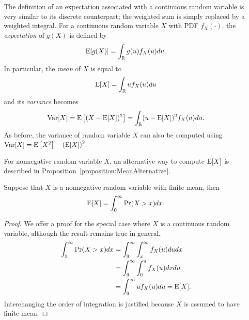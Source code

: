 The definition of an expectation associated with a continuous random variable is very similar to its discrete counterpart;
the weighted sum is simply replaced by a weighted integral.
For a continuous random variable $X$ with PDF $f_X(\cdot)$, the \emph{expectation} of $g(X)$ is defined by 
\begin{equation*}
\mathrm{E} [g(X)]
= \int_{\mathbb{R}} g(u) f_X (u) du .
\end{equation*}
In particular, the \emph{mean} of $X$ is equal to 
\begin{equation*}
\mathrm{E} [X]
= \int_{\mathbb{R}} u f_X (u) du
\end{equation*}
and its \emph{variance} becomes 
\begin{equation*}
\mathrm{Var} [X] = \mathrm{E} \left[ (X - \mathrm{E}[X])^2 \right]
= \int_{\mathbb{R}} (u - \mathrm{E}[X])^2 f_X (u) du .
\end{equation*}
As before, the variance of random variable $X$ can also be computed using $\mathrm{Var} [X] = \mathrm{E} \left[ X^2 \right] - \left( \mathrm{E} [X] \right)^2$.



For nonnegative random variable $X$, an alternative way to compute $\mathrm{E} [X]$ is described in Proposition~\ref{proposition:MeanAlternative}. 

\begin{proposition} \label{proposition:MeanAlternative}
Suppose that $X$ is a nonnegative random variable with finite mean, then
\begin{equation*}
\mathrm{E} [X] = \int_0^{\infty} \Pr (X > x) dx .
\end{equation*}
\end{proposition}
\begin{proof}
We offer a proof for the special case where $X$ is a continuous random variable, although the result remains true in general,
\begin{equation*}
\begin{split}
\int_0^{\infty} \Pr (X > x) dx
&= \int_0^{\infty} \int_x^{\infty} f_X(u) du dx \\
&= \int_0^{\infty} \int_0^{u} f_X(u) dx du \\
&= \int_0^{\infty} u f_X(u) du
= \mathrm{E} [X] .
\end{split}
\end{equation*}
Interchanging the order of integration is justified because $X$ is assumed to have finite mean.
\end{proof}

